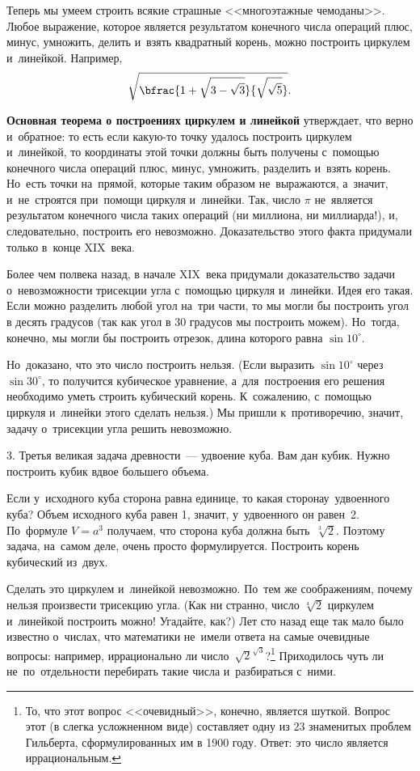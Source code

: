 Теперь мы умеем строить всякие страшные <<многоэтажные чемоданы>>. Любое выражение, которое является
результатом конечного числа операций плюс, минус, умножить, делить и~взять квадратный корень, можно
построить циркулем и~линейкой. Например,
$$
\sqrt{\bfrac{1+\sqrt{3-\sqrt{3}}}{\sqrt{\sqrt{5}}}}.
$$


\textbf{Основная теорема о построениях циркулем и линейкой} утверждает, что верно и~обратное: то есть если какую-то точку удалось построить
циркулем и~линейкой, то координаты этой точки должны быть получены с~помощью конечного числа
операций плюс, минус, умножить, разделить и~взять корень. Но~есть точки на~прямой, которые таким
образом не~выражаются, а~значит, и~не~строятся при~помощи циркуля и~линейки. Так,
число $\pi$ не~является результатом конечного числа таких операций (ни миллиона, ни миллиарда!), и, следовательно, построить его невозможно.
Доказательство этого факта придумали только в~конце XIX~века.

Более чем полвека назад, в начале XIX~века  придумали доказательство задачи о~невозможности трисекции угла с~помощью циркуля
и~линейки.
 Идея его такая. Если можно разделить любой угол на~три части, то мы могли бы построить
угол в десять градусов (так как угол в 30 градусов мы построить можем).
 Но~тогда, конечно, мы могли бы построить отрезок,
длина которого равна $\sin10^{\circ}$.



\pagebreak

Но~доказано, что это число построить нельзя. (Если выразить $\sin10^{\circ}$ через $\sin30^{\circ}$, то получится
кубическое уравнение, а~для~построения его решения необходимо уметь строить кубический корень.
К~сожалению, с~помощью циркуля и~линейки этого сделать нельзя.) Мы пришли к~противоречию, значит,
задачу о~трисекции угла решить невозможно.

3. Третья великая задача древности~--- удвоение куба. Вам дан кубик. Нужно построить кубик вдвое
большего объема.

Если у~исходного куба сторона равна единице, то какая сторона\linebreak у~удвоенного куба? Объем исходного куба
равен 1, значит, у~удвоенного он равен~2. По~формуле $V=a^{3}$ получаем, что сторона куба должна быть~$\sqrt[3]{2}$.
Поэтому задача, на~самом деле, очень просто формулируется. Построить корень кубический из~двух.

Сделать это циркулем и~линейкой невозможно. По~тем же соображениям, почему нельзя произвести
трисекцию угла. (Как ни странно, число $\sqrt[4]{2}$ циркулем и~линейкой построить можно! Угадайте, как?) Лет
сто назад еще так мало было известно о~числах, что математики не~имели ответа на самые очевидные вопросы:
например, иррационально ли число~$\sqrt{2}^{\sqrt3}$?\footnote{То, что этот вопрос <<очевидный>>, конечно,
является шуткой. Вопрос этот (в слегка усложненном виде) составляет одну из $23$ знаменитых
проблем Гильберта, сформулированных им в 1900 году. Ответ: это число является иррациональным.}
Приходилось чуть ли не~по~отдельности перебирать такие числа и~разбираться с~ними.

